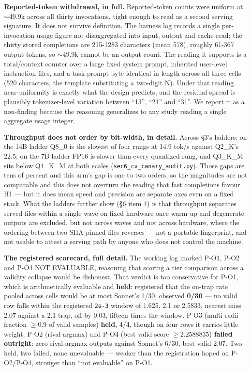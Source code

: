 \textbf{Reported-token withdrawal, in full.} Reported-token counts were uniform at $\sim$49.9k across all thirty invocations, tight enough to read as a second serving signature. It does not survive definition. The harness log records a single per-invocation usage figure not disaggregated into input, output and cache-read; the thirty stored completions are 215-1283 characters (mean 578), roughly 61-367 output tokens, so $\sim$49.9k cannot be an output count. The reading it supports is a total/context counter over a large fixed system prompt, inherited user-level instruction files, and a task prompt byte-identical in length across all three cells (520 characters, the template substituting a two-digit N). Under that reading near-uniformity is exactly what the design predicts, and the residual spread is plausibly tokenizer-level variation between ``13'', ``21'' and ``31''. We report it as a non-finding because the reasoning generalizes to any study reading a single aggregate usage integer.

\textbf{Throughput does not order by bit-width, in detail.} Across \S3's ladders: on the 14B ladder Q8\_0 is the slowest of four rungs at 14.9 tok/s against Q2\_K's 22.5; on the 7B ladder FP16 is slower than every quantized rung, and Q3\_K\_M sits below Q4\_K\_M at both scales (\texttt{sec6\_cv\_canary\_audit.py}). Those gaps are tens of percent and this arm's gap is one to two orders, so the magnitudes are not comparable and this does not overturn the reading that fast completions favour H1 --- but it does mean speed and precision are separate axes even on a fixed stack. What the ladders further show (\S6 item 4) is that throughput separates served files within a single wave on fixed hardware once warm-up and degenerate outputs are excluded, but not across waves and not across hardware, where the ordering between two SHA-pinned files reverses --- not a portable fingerprint, and not usable to attest a serving path by anyone who does not control the machine.

\textbf{The registered scorecard, full detail.} The working log marked P-O1, P-O2 and P-O4 NOT EVALUABLE, reasoning that scoring a tier comparison across a validity collapse would be dishonest. That verdict is too conservative for P-O1, which is arithmetically evaluable and \textbf{held}: registered that the on-trap rate pooled across cells would be at most Sonnet's 1/30, observed \textbf{0/30} --- no valid row falls within the registered \texttt{2e-3} window of 1.625, 2.1 or 2.5833, nearest miss 2.07 against a 2.1 trap, off by 0.03, fifteen times the window. P-O3 (multi-radii fraction $\ge 0.9$ of valid samples) \textbf{held}, 4/4, though on four rows it carries little weight. P-O2 (rival-argmax) and P-O4 (best valid score $\ge 2.2588835$) \textbf{failed outright}: zero rival-argmax outputs against Sonnet's 6/30, best valid 2.07. Two held, two failed, none unevaluable --- weaker than the registration hoped on P-O2/P-O4, stronger than ``not evaluable'' on P-O1.

